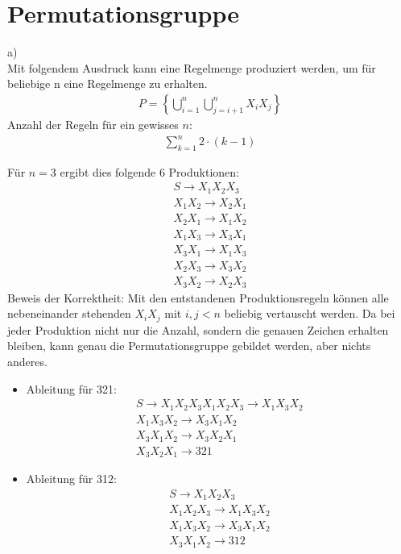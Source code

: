 \documentclass[a4paper,10pt,headlines=3.2]{scrartcl}
\begin{document}
\section{Permutationsgruppe}
a) \\
Mit folgendem Ausdruck kann eine Regelmenge produziert werden, um für beliebige n eine Regelmenge zu erhalten.
\begin{align}
P = \left \{ \bigcup _{i=1}^{n} \bigcup_{j=i+1}^{n} X_i X_j \right \}
\end{align}
Anzahl der Regeln für ein gewisses $n$:
\begin{align}
\sum_{k=1}^{n} 2\cdot (k-1)
\end{align}

Für $n=3$ ergibt dies folgende 6 Produktionen:
\begin{align}
S \rightarrow X_1 X_2 X_3 \\
X_1 X_2 \rightarrow X_2 X_1 \\
X_2 X_1 \rightarrow X_1 X_2 \\
X_1 X_3 \rightarrow X_3 X_1 \\
X_3 X_1 \rightarrow X_1 X_3 \\
X_2 X_3 \rightarrow X_3 X_2 \\
X_3 X_2 \rightarrow X_2 X_3
\end{align}
Beweis der Korrektheit: Mit den entstandenen Produktionsregeln können alle nebeneinander stehenden $X_i X_j$ mit $i, j < n$ beliebig vertauscht werden. Da bei jeder Produktion nicht nur die Anzahl, sondern die genauen Zeichen erhalten bleiben, kann genau die Permutationsgruppe gebildet werden, aber nichts anderes. 
\begin{itemize}
\item Ableitung für 321:
\begin{align}
S \rightarrow X_1 X_2 X_3
X_1 X_2 X_3 \rightarrow X_1 X_3 X_2 \\
X_1 X_3 X_2 \rightarrow X_3 X_1 X_2 \\
X_3 X_1 X_2 \rightarrow X_3 X_2 X_1 \\
X_3 X_2 X_1 \rightarrow 321
\end{align}
\item Ableitung für 312:
\begin{align}
S \rightarrow X_1 X_2 X_3 \\
X_1 X_2 X_3 \rightarrow X_1 X_3 X_2 \\
X_1 X_3 X_2 \rightarrow X_3 X_1 X_2 \\
X_3 X_1 X_2 \rightarrow 312 
\end{align}
\end{itemize}
\end{document}
